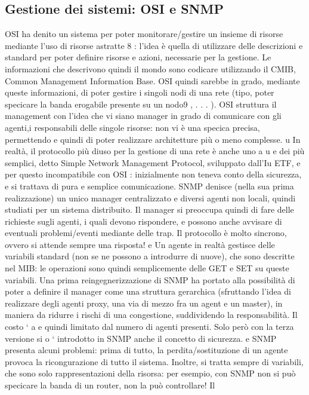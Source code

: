 \subsection{Gestione dei sistemi: OSI e SNMP}
OSI ha denito un sistema per poter monitorare/gestire un insieme di risorse
mediante l'uso di risorse astratte 8 : l'idea è quella di utilizzare delle descrizioni
e
standard per poter definire risorse e azioni, necessarie per la gestione. Le informazioni che descrivono quindi il mondo
sono codicare utilizzando il CMIB,
Common Management Information Base. OSI quindi sarebbe in grado, mediante queste informazioni, di poter gestire i
singoli nodi di una rete (tipo, poter
specicare la banda erogabile presente su un nodo9 , . . . ). OSI struttura il management con l'idea che vi siano manager
in grado di comunicare con gli agenti,i
responsabili delle singole risorse: non vi è una specica precisa, permettendo
e
quindi di poter realizzare architetture più o meno complesse.
u
In realtà, il protocollo più diuso per la gestione di una rete è anche uno
a
u
e
dei più semplici, detto Simple Network Management Protocol, sviluppato dall'Iu
ETF, e per questo incompatibile con OSI : inizialmente non teneva conto della
sicurezza, e si trattava di pura e semplice comunicazione.
SNMP denisce (nella sua prima realizzazione) un unico manager centralizzato e diversi agenti non locali, quindi studiati
per un sistema distribuito. Il
manager si preoccupa quindi di fare delle richieste sugli agenti, i quali devono
rispondere, e possono anche avvisare di eventuali problemi/eventi mediante delle
trap. Il protocollo è molto sincrono, ovvero si attende sempre una risposta!
e
Un agente in realtà gestisce delle variabili standard (non se ne possono
a
introdurre di nuove), che sono descritte nel MIB: le operazioni sono quindi
semplicemente delle GET e SET su queste variabili.
Una prima reingegnerizzazione di SNMP ha portato alla possibilità di poter
a
definire il manager come una struttura gerarchica (sfruttando l'idea di realizzare
degli agenti proxy, una via di mezzo fra un agent e un master), in maniera da
ridurre i rischi di una congestione, suddividendo la responsabilità. Il costo `
a
e
quindi limitato dal numero di agenti presenti. Solo però con la terza versione si
o
` introdotto in SNMP anche il concetto di sicurezza.
e
SNMP presenta alcuni problemi: prima di tutto, la perdita/sostituzione di
un agente provoca la ricongurazione di tutto il sistema. Inoltre, si tratta sempre di variabili, che sono solo
rappresentazioni della risorsa: per esempio, con
SNMP non si può specicare la banda di un router, non la può controllare! Il
